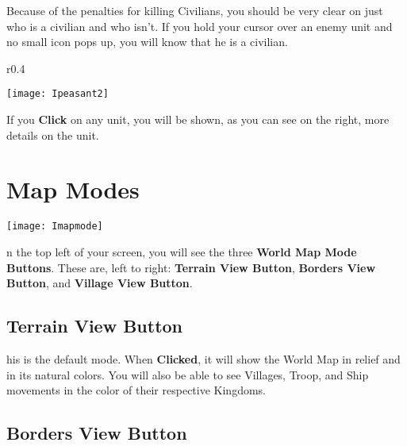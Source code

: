 Because of the penalties for killing Civilians, you should be very clear on just who is a civilian and who isn’t. If you hold your cursor over an enemy unit and no small icon pops up, you will know that he is a civilian.

\begin{wrapfigure}{r}{0.4\textwidth}
\vspace{-20pt}
    \begin{center}
        \texttt{[image: Ipeasant2]} %
\end{center}
\vspace{-20pt}
\end{wrapfigure}

If you \textbf{Click} on any unit, you will be shown, as you can see on the right, more details on the unit. \\

\section{\textsf{Map Modes}}


\begin{center}
    \texttt{[image: Imapmode]} %
\end{center}

n the top left of your screen, you will see the three \textbf{World Map Mode Buttons}. These are, left to right: \textbf{Terrain View Button}, \textbf{Borders View Button}, and \textbf{Village View Button}.

\subsection{\textsf{Terrain View Button}}


his is the default mode. When \textbf{Clicked}, it will show the World Map in relief and in its natural colors. You will also be able to see Villages, Troop, and Ship movements in the color of their respective Kingdoms.

\subsection{\textsf{Borders View Button}}


